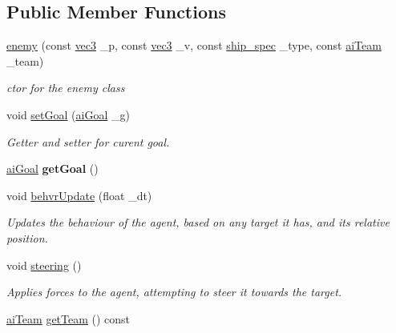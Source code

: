 \subsection*{Public Member Functions}
\begin{DoxyCompactItemize}
\item 
\hyperlink{classenemy_acca194a2f379300a8ee019ab3bb36298}{enemy} (const \hyperlink{structvec3}{vec3} \-\_\-p, const \hyperlink{structvec3}{vec3} \-\_\-v, const \hyperlink{ship_8hpp_af74a63841701826d661cb9809aaf7092}{ship\-\_\-spec} \-\_\-type, const \hyperlink{enemy_8hpp_abac1fdbabb5a6be5f0d6ae40be5c5a58}{ai\-Team} \-\_\-team)
\begin{DoxyCompactList}\small\item\em ctor for the enemy class \end{DoxyCompactList}\item 
\hypertarget{classenemy_a98c55268826433d0b9ad4b1f1e7075fa}{void \hyperlink{classenemy_a98c55268826433d0b9ad4b1f1e7075fa}{set\-Goal} (\hyperlink{enemy_8hpp_a6e73eb3e8e86f5922e45adeb450ceb1e}{ai\-Goal} \-\_\-g)}\label{classenemy_a98c55268826433d0b9ad4b1f1e7075fa}

\begin{DoxyCompactList}\small\item\em Getter and setter for curent goal. \end{DoxyCompactList}\item 
\hypertarget{classenemy_a0cda47391d310982f33059297f6aa947}{\hyperlink{enemy_8hpp_a6e73eb3e8e86f5922e45adeb450ceb1e}{ai\-Goal} {\bfseries get\-Goal} ()}\label{classenemy_a0cda47391d310982f33059297f6aa947}

\item 
void \hyperlink{classenemy_a98c0bb6881129829530c2dddb46e7c3b}{behvr\-Update} (float \-\_\-dt)
\begin{DoxyCompactList}\small\item\em Updates the behaviour of the agent, based on any target it has, and its relative position. \end{DoxyCompactList}\item 
\hypertarget{classenemy_a335001d4aa50011d3031f637cc8bc19f}{void \hyperlink{classenemy_a335001d4aa50011d3031f637cc8bc19f}{steering} ()}\label{classenemy_a335001d4aa50011d3031f637cc8bc19f}

\begin{DoxyCompactList}\small\item\em Applies forces to the agent, attempting to steer it towards the target. \end{DoxyCompactList}\item 
\hypertarget{classenemy_a3d219aef97dd32ff974b67301875b553}{\hyperlink{enemy_8hpp_abac1fdbabb5a6be5f0d6ae40be5c5a58}{ai\-Team} \hyperlink{classenemy_a3d219aef97dd32ff974b67301875b553}{get\-Team} () const }\label{classenemy_a3d219aef97dd32ff974b67301875b553}


\end{DoxyCompactItemize}
